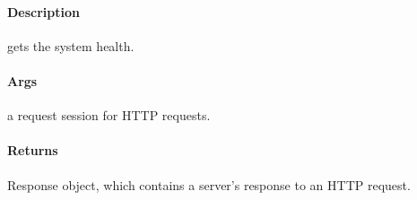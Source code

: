 \documentclass[letterpaper,10pt,english]{sphinxmanual}
\begin{document}
\begin{fulllineitems}
\label{\detokenize{gemini_lidar_hub_API:gemini_lidar_hub_API.get_lidar_hub_health}}
\pysigstartsignatures
{}
\pysigstopsignatures

\paragraph{Description}
\label{\detokenize{gemini_lidar_hub_API:id26}}
\sphinxAtStartPar
gets the system health.


\paragraph{Args}
\label{\detokenize{gemini_lidar_hub_API:id27}}\begin{description}
\sphinxAtStartPar
a request session for HTTP requests.

\end{description}


\paragraph{Returns}
\label{\detokenize{gemini_lidar_hub_API:id28}}\begin{description}
\sphinxAtStartPar
Response object, which contains a server’s response to an HTTP request.

\end{description}

\end{fulllineitems}

\end{document}
